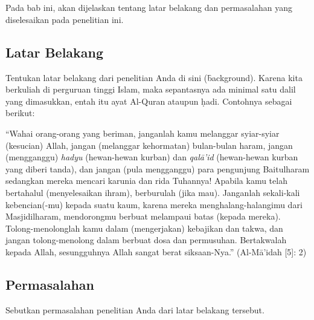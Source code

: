 \chapter{\babSatu}
Pada bab ini, akan dijelaskan tentang latar belakang dan permasalahan yang diselesaikan pada penelitian ini.


\section{Latar Belakang}
Tentukan latar belakang dari penelitian Anda di sini (\f{background}).
Karena kita berkuliah di perguruan tinggi Islam, maka sepantasnya ada minimal
satu dalil yang dimasukkan, entah itu ayat Al-Quran ataupun \d{h}adi.
Contohnya sebagai berikut:

\setRTL
\noindent \textarabic{\quranayah*[5][2]} %
\setLTR
\vspace*{12pt}

\begin{spacing}{1.125}
``Wahai orang-orang yang beriman, janganlah kamu melanggar syiar-syiar (kesucian) Allah,
jangan (melanggar kehormatan) bulan-bulan haram, jangan (mengganggu) \textit{hadyu} (hewan-hewan kurban)
dan \textit{qal\=a'id} (hewan-hewan kurban yang diberi tanda), dan jangan (pula mengganggu)
para pengunjung Baitulharam sedangkan mereka mencari karunia dan rida Tuhannya! Apabila kamu
telah bertahalul (menyelesaikan ihram), berburulah (jika mau). Janganlah sekali-kali kebencian(-mu)
kepada suatu kaum, karena mereka menghalang-halangimu dari Masjidilharam, mendorongmu berbuat
melampaui batas (kepada mereka). Tolong-menolonglah kamu dalam (mengerjakan) kebajikan dan takwa,
dan jangan tolong-menolong dalam berbuat dosa dan permusuhan.
Bertakwalah kepada Allah, sesungguhnya Allah sangat berat siksaan-Nya.''
(Al-M\={a}'idah [5]: 2)\par
\end{spacing}
\vspace*{6pt}

\lipsum[44]

\section{Permasalahan}
Sebutkan permasalahan penelitian Anda dari latar belakang tersebut.

